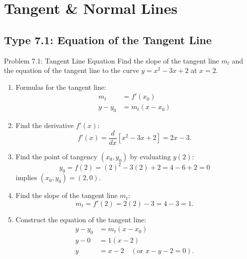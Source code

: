 \documentclass[11pt,a4paper]{article}
\begin{document}
\newpage
\section{Tangent \& Normal Lines}

\subsection{Type 7.1: Equation of the Tangent Line}
\begin{problembox}{Problem 7.1: Tangent Line Equation}
Find the slope of the tangent line $m_t$ and the equation of the tangent line to the curve $y = x^2 - 3x + 2$ at $x = 2$.
\end{problembox}
\begin{solutionbox}
\begin{enumerate}
	\item [Step 1.] Formulas for the tangent line:
	\begin{align*}
		m_t &= f'(x_0) \\
		y - y_0 &= m_t(x - x_0)
	\end{align*}
	
	\item [Step 2.] Find the derivative $f'(x)$:
	\begin{equation}\label{eq;7.1.1}
		f'(x) = \frac{d}{dx}\left[x^2 - 3x + 2\right] = 2x - 3.
	\end{equation}

	\item [Step 3.] Find the point of tangency $(x_0, y_0)$ by evaluating $y(2)$:
	\begin{equation*}
		y_0 = f(2) = (2)^2 - 3(2) + 2 = 4 - 6 + 2 = 0
	\end{equation*}
	implies $(x_0, y_0) = (2, 0)$.

	\item [Step 4.] Find the slope of the tangent line $m_t$:
	\begin{equation*}
		m_t = f'(2) = 2(2) - 3 = 4 - 3 = 1.
	\end{equation*}

	\item [Step 5.] Construct the equation of the tangent line:
	\begin{align*}
		y - y_0 &= m_t(x - x_0) \\
		y - 0 &= 1(x - 2) \\
		y &= x - 2 \quad \left(\text{or } x - y - 2 = 0\right).
	\end{align*}
\end{enumerate}
\end{solutionbox}
\end{document}
